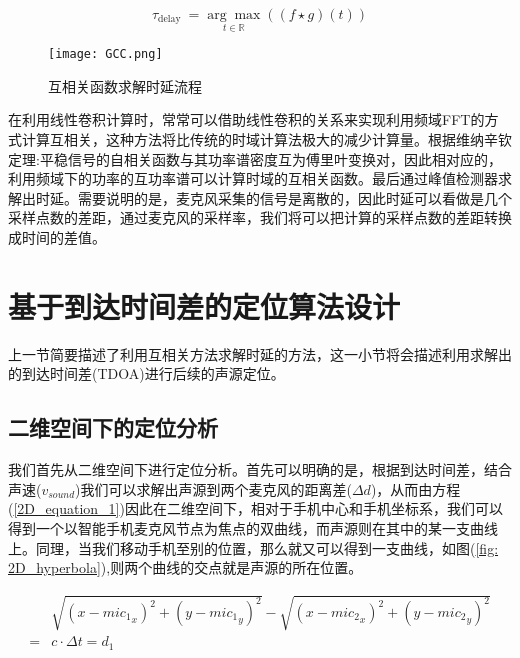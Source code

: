 \documentclass[winfonts]{njuthesis}
\begin{document}
		\begin{equation}
		\tau_{\text {delay }}=\underset{t \in \mathbb{R}}{\arg \max }((f \star g)(t))
		\end{equation}
		
		\begin{figure}[H]
			\centering
			\texttt{[image: GCC.png]} 
			\caption{互相关函数求解时延流程}
			\label{fig: GCC}
		\end{figure}	
		
		在利用线性卷积计算时，常常可以借助线性卷积的关系来实现利用频域FFT的方式计算互相关，这种方法将比传统的时域计算法极大的减少计算量。根据维纳辛钦定理:平稳信号的自相关函数与其功率谱密度互为傅里叶变换对，因此相对应的，利用频域下的功率的互功率谱可以计算时域的互相关函数。最后通过峰值检测器求解出时延。需要说明的是，麦克风采集的信号是离散的，因此时延可以看做是几个采样点数的差距，通过麦克风的采样率，我们将可以把计算的采样点数的差距转换成时间的差值。
	
	\section{基于到达时间差的定位算法设计}
	
		上一节简要描述了利用互相关方法求解时延的方法，这一小节将会描述利用求解出的到达时间差(TDOA)进行后续的声源定位。
		
		\subsection{二维空间下的定位分析}
		
		我们首先从二维空间下进行定位分析。首先可以明确的是，根据到达时间差，结合声速($v_{sound}$)我们可以求解出声源到两个麦克风的距离差($\Delta d$)，从而由方程(\ref{2D_equation_1})因此在二维空间下，相对于手机中心和手机坐标系，我们可以得到一个以智能手机麦克风节点为焦点的双曲线，而声源则在其中的某一支曲线上。同理，当我们移动手机至别的位置，那么就又可以得到一支曲线，如图(\ref{fig: 2D_hyperbola}),则两个曲线的交点就是声源的所在位置。
		
		\begin{equation}
		\begin{aligned}
			&\sqrt{(x-{mic_1}_x)^2+(y-{mic_1}_y)^2} - \sqrt{(x-{mic_2}_x)^2+(y-{mic_2}_y)^2}\\
		  = & c \cdot \Delta t= d_1 \label{2D_equation_1}
		\end{aligned}
		\end{equation}
		
\end{document}
